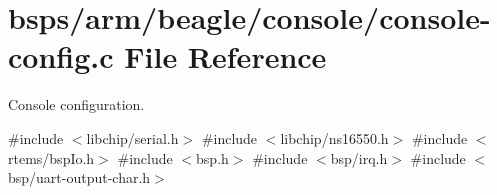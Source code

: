 \hypertarget{arm_2beagle_2console_2console-config_8c}{}\section{bsps/arm/beagle/console/console-\/config.c File Reference}
\label{arm_2beagle_2console_2console-config_8c}


Console configuration.  


{\ttfamily \#include $<$libchip/serial.\+h$>$}\newline
{\ttfamily \#include $<$libchip/ns16550.\+h$>$}\newline
{\ttfamily \#include $<$rtems/bsp\+Io.\+h$>$}\newline
{\ttfamily \#include $<$bsp.\+h$>$}\newline
{\ttfamily \#include $<$bsp/irq.\+h$>$}\newline
{\ttfamily \#include $<$bsp/uart-\/output-\/char.\+h$>$}\newline
